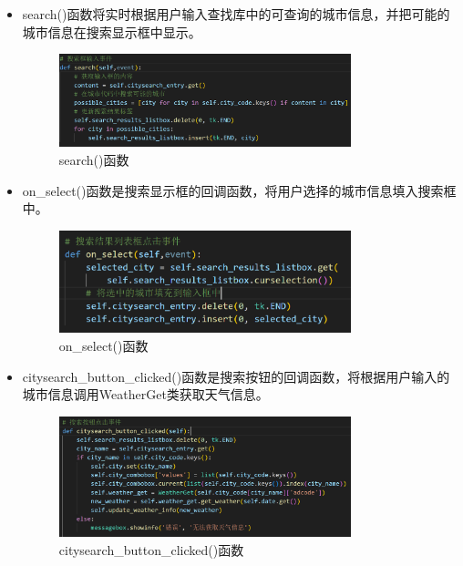 \documentclass[UTF8]{ctexart}
\begin{document}
\begin{enumerate}
         \begin{itemize}
            \item search()函数将实时根据用户输入查找库中的可查询的城市信息，并把可能的城市信息在搜索显示框中显示。
            \begin{figure}[H]
               \centering
               \includegraphics[width=0.8\textwidth]{pic3.png}
               \caption{search()函数}
            \end{figure}
            \item on\_select()函数是搜索显示框的回调函数，将用户选择的城市信息填入搜索框中。
            \begin{figure}[H]
               \centering
               \includegraphics[width=0.8\textwidth]{pic4.png}
               \caption{on\_select()函数}
            \end{figure}
            \item citysearch\_button\_clicked()函数是搜索按钮的回调函数，将根据用户输入的城市信息调用WeatherGet类获取天气信息。
            \begin{figure}[H]
               \centering
               \includegraphics[width=0.8\textwidth]{pic5.png}
               \caption{citysearch\_button\_clicked()函数}
            \end{figure}
         \end{itemize}

\end{enumerate}
\end{document}
